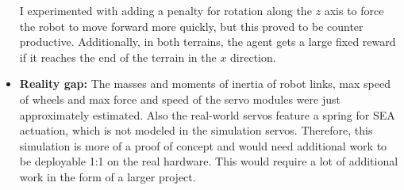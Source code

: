 \documentclass{article}
\begin{document}
\begin{itemize}
    I experimented with adding a penalty for rotation along the $z$ axis to force the robot to move forward more quickly, but this proved to be counter productive.
    Additionally, in both terrains, the agent gets a large fixed reward if it reaches the end of the terrain in the $x$ direction.
  \item \textbf{Reality gap:} The masses and moments of inertia of robot links, max speed of wheels and max force and speed of the servo modules were just approximately estimated. Also the real-world servos feature a spring for SEA actuation, which is not modeled in the simulation servos.
    Therefore, this simulation is more of a proof of concept and would need additional work to be deployable 1:1 on the real hardware.
    This would require a lot of additional work in the form of a larger project.
\end{itemize}
\end{document}
